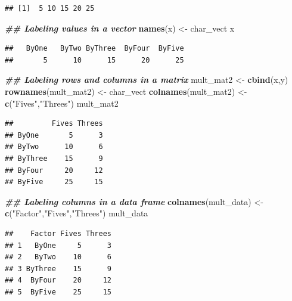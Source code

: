 \documentclass[
]{book}
\newenvironment{Shaded}{\begin{snugshade}}{\end{snugshade}}
\newcommand{\DocumentationTok}[1]{\textcolor[rgb]{0.56,0.35,0.01}{\textbf{\textit{#1}}}}
\newcommand{\FunctionTok}[1]{\textcolor[rgb]{0.13,0.29,0.53}{\textbf{#1}}}
\newcommand{\NormalTok}[1]{#1}
\newcommand{\OtherTok}[1]{\textcolor[rgb]{0.56,0.35,0.01}{#1}}
\newcommand{\StringTok}[1]{\textcolor[rgb]{0.31,0.60,0.02}{#1}}
\theoremstyle{definition}
\theoremstyle{definition}
\theoremstyle{definition}
\theoremstyle{definition}
\theoremstyle{remark}
\begin{document}
\begin{verbatim}
## [1]  5 10 15 20 25
\end{verbatim}

\begin{Shaded}
\begin{Highlighting}[]
\DocumentationTok{\#\# Labeling values in a vector}
\FunctionTok{names}\NormalTok{(x) }\OtherTok{\textless{}{-}}\NormalTok{ char\_vect}
\NormalTok{x}
\end{Highlighting}
\end{Shaded}

\begin{verbatim}
##   ByOne   ByTwo ByThree  ByFour  ByFive 
##       5      10      15      20      25
\end{verbatim}

\begin{Shaded}
\begin{Highlighting}[]
\DocumentationTok{\#\# Labeling rows and columns in a matrix}
\NormalTok{mult\_mat2 }\OtherTok{\textless{}{-}} \FunctionTok{cbind}\NormalTok{(x,y)}
\FunctionTok{rownames}\NormalTok{(mult\_mat2) }\OtherTok{\textless{}{-}}\NormalTok{ char\_vect}
\FunctionTok{colnames}\NormalTok{(mult\_mat2) }\OtherTok{\textless{}{-}} \FunctionTok{c}\NormalTok{(}\StringTok{"Fives"}\NormalTok{,}\StringTok{"Threes"}\NormalTok{)}
\NormalTok{mult\_mat2}
\end{Highlighting}
\end{Shaded}

\begin{verbatim}
##         Fives Threes
## ByOne       5      3
## ByTwo      10      6
## ByThree    15      9
## ByFour     20     12
## ByFive     25     15
\end{verbatim}

\begin{Shaded}
\begin{Highlighting}[]
\DocumentationTok{\#\# Labeling columns in a data frame}
\FunctionTok{colnames}\NormalTok{(mult\_data) }\OtherTok{\textless{}{-}} \FunctionTok{c}\NormalTok{(}\StringTok{"Factor"}\NormalTok{,}\StringTok{"Fives"}\NormalTok{,}\StringTok{"Threes"}\NormalTok{)}
\NormalTok{mult\_data}
\end{Highlighting}
\end{Shaded}

\begin{verbatim}
##    Factor Fives Threes
## 1   ByOne     5      3
## 2   ByTwo    10      6
## 3 ByThree    15      9
## 4  ByFour    20     12
## 5  ByFive    25     15
\end{verbatim}
\end{document}
